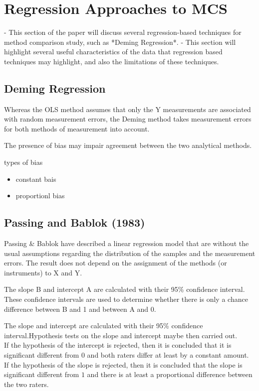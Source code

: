 \documentclass[MAIN.tex]{subfiles}
\begin{document}
\section{Regression Approaches to MCS}
- This section of the paper will discuss several regression-based techniques for method comparison study, 
such as *Deming Regression*. 
- This section will highlight several useful characteristics of the data that 
regression based techniques may highlight, and also the limitations of these techniques.

\subsection*{ Deming Regression}
Whereas the OLS method assumes that only the Y measurements are associated with 
random measurement errors, the Deming method takes measurement errors for both methods of measurement into account.




The presence of bias may impair agreement between the two analytical methods.

types of bias

\begin{itemize}
	\item constant bais
	\item proportionl bias
\end{itemize}

\subsection{Passing and Bablok (1983) }
Passing \& Bablok have described a linear regression model that are without the usual assumptions regarding the distribution of
the samples and the measurement errors. The result does not depend on the assignment of the methods (or instruments) to X and Y.



The slope B and intercept A are calculated with their 95\% confidence interval. These confidence intervals are used to determine whether there is only a chance difference between B and 1 and between A and 0.


 The slope and intercept  are calculated with their 95\% confidence interval.Hypothesis tests on the slope and intercept maybe then
carried out.\\

If the hypothesis of the intercept is rejected, then it is concluded that it is significant different from $0$ and both
raters differ at least by a constant amount.
	\\
If the hypothesis of the slope is rejected, then it is concluded that the slope is significant different from $1$ and there is at
least a proportional difference between the two raters.
\end{document}
